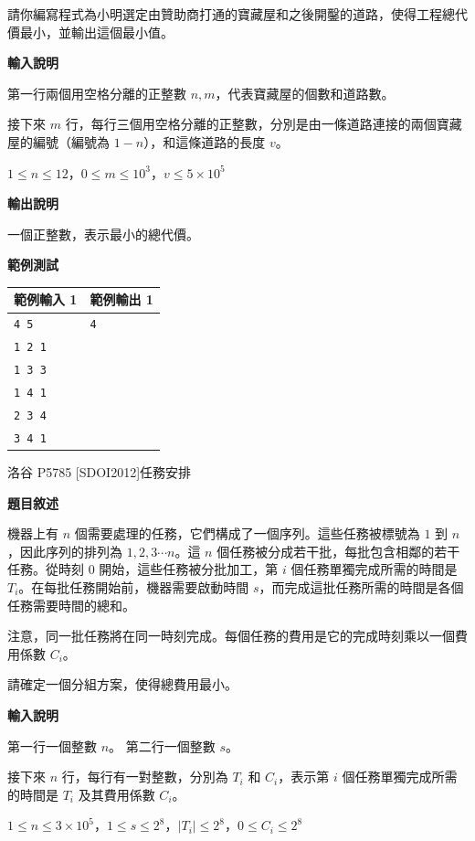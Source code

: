     請你編寫程式為小明選定由贊助商打通的寶藏屋和之後開鑿的道路，使得工程總代價最小，並輸出這個最小值。

    \textbf{輸入說明}

    第一行兩個用空格分離的正整數 $n,m$，代表寶藏屋的個數和道路數。

    接下來 $m$ 行，每行三個用空格分離的正整數，分別是由一條道路連接的兩個寶藏屋的編號（編號為 $1-n$），和這條道路的長度 $v$。

    $1 \le n \le 12$，$0 \le m \le 10^3$，$v \le 5\times 10^5$

    \textbf{輸出說明}

    一個正整數，表示最小的總代價。

    \textbf{範例測試}

    \begin{tabular}{|m{7cm}|m{7cm}|}
        \hline
        範例輸入 1 & 範例輸出 1 \\
        \hline
        \verb|4 5| & \verb|4| \\
        \verb|1 2 1| & \\
        \verb|1 3 3| & \\
        \verb|1 4 1| & \\
        \verb|2 3 4| & \\
        \verb|3 4 1| & \\
        \hline
    \end{tabular}

    \problem 洛谷 P5785 [SDOI2012]任務安排

    \textbf{題目敘述}

    機器上有 $n$ 個需要處理的任務，它們構成了一個序列。這些任務被標號為 $1$ 到 $n$，因此序列的排列為 $1 , 2 , 3 \cdots n$。這 $n$ 個任務被分成若干批，每批包含相鄰的若干任務。從時刻 $0$ 開始，這些任務被分批加工，第 $i$ 個任務單獨完成所需的時間是 $T_i$。在每批任務開始前，機器需要啟動時間 $s$，而完成這批任務所需的時間是各個任務需要時間的總和。

    注意，同一批任務將在同一時刻完成。每個任務的費用是它的完成時刻乘以一個費用係數 $C_i$。

    請確定一個分組方案，使得總費用最小。

    \textbf{輸入說明}

    第一行一個整數 $n$。
    第二行一個整數 $s$。

    接下來 $n$ 行，每行有一對整數，分別為 $T_i$ 和 $C_i$，表示第 $i$ 個任務單獨完成所需的時間是 $T_i$ 及其費用係數 $C_i$。

    $1 \le n \le 3 \times 10^5$，$1 \le s \le 2^8$，$ \left| T_i \right| \le 2^8$，$0 \le C_i \le 2^8$

